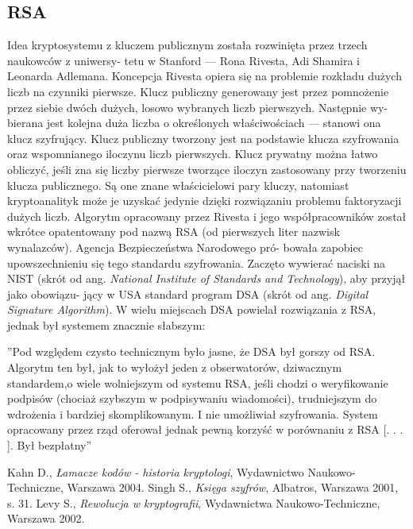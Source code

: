\documentclass[a4paper]{article}
\begin{document}
\subsection{RSA}
Idea kryptosystemu z kluczem publicznym została rozwinięta przez trzech naukowców z uniwersy-
tetu w Stanford — Rona Rivesta, Adi Shamira i Leonarda Adlemana. Koncepcja Rivesta opiera
się na problemie rozkładu dużych liczb na czynniki pierwsze. Klucz publiczny generowany jest
przez pomnożenie przez siebie dwóch dużych, losowo wybranych liczb pierwszych. Następnie wy-
bierana jest kolejna duża liczba o określonych właściwościach — stanowi ona klucz szyfrujący.
Klucz publiczny tworzony jest na podstawie klucza szyfrowania oraz wspomnianego iloczynu liczb
pierwszych. Klucz prywatny można łatwo obliczyć, jeśli zna się liczby pierwsze tworzące iloczyn
zastosowany przy tworzeniu klucza publicznego. Są one znane właścicielowi pary kluczy, natomiast
kryptoanalityk może je uzyskać jedynie dzięki rozwiązaniu problemu faktoryzacji dużych liczb.
Algorytm opracowany przez Rivesta i jego współpracowników został wkrótce opatentowany pod
nazwą RSA (od pierwszych liter nazwisk wynalazców). Agencja Bezpieczeństwa Narodowego pró-
bowała zapobiec upowszechnieniu się tego standardu szyfrowania. Zaczęto wywierać naciski na
NIST (skrót od ang. \textit{National Institute of Standards and Technology}), aby przyjął jako obowiązu-
jący w USA standard program DSA (skrót od ang. \textit{Digital Signature Algorithm}).
W wielu miejscach DSA powielał rozwiązania z RSA, jednak był systemem znacznie słabszym:
\begin{center}
”Pod względem czysto technicznym było jasne, że DSA był gorszy od RSA. Algorytm ten był,
jak to wyłożył jeden z obserwatorów, dziwacznym standardem,o wiele wolniejszym od systemu
RSA, jeśli chodzi o weryfikowanie podpisów (chociaż szybszym w podpisywaniu wiadomości),
trudniejszym do wdrożenia i bardziej skomplikowanym. I nie umożliwiał szyfrowania. System
opracowany przez rząd oferował jednak pewną korzyść w porównaniu z RSA [. . . ]. Był
bezpłatny”\cite{odwol3}
\end{center}
\begin{thebibliography}{9}
Kahn D., \textit{Łamacze kodów - historia kryptologi}, Wydawnictwo Naukowo-Techniczne, Warszawa 2004.
 Singh S., \textit{Księga szyfrów}, Albatros, Warszawa 2001, s. 31.
 Levy S., \textit{Rewolucja w kryptografii}, Wydawnictwa Naukowo-Techniczne, Warszawa 2002.
\end{thebibliography}
\end{document}

